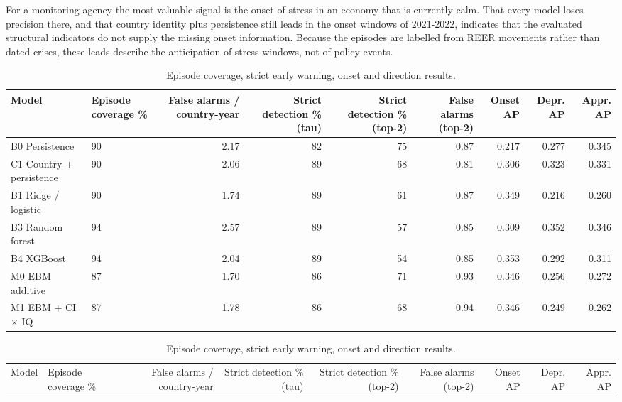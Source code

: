 \documentclass[preprint,12pt,authoryear]{elsarticle}
\begin{document}
For a monitoring agency the most valuable signal is the onset of stress in an economy that is currently calm. That every model loses precision there, and that country identity plus persistence still leads in the onset windows of 2021-2022, indicates that the evaluated structural indicators do not supply the missing onset information. Because the episodes are labelled from REER movements rather than dated crises, these leads describe the anticipation of stress windows, not of policy events.

\begin{table}[!htbp]
\centering
\scriptsize
\setlength{\tabcolsep}{3pt}
\caption{Episode coverage, strict early warning, onset and direction results.}
\label{tab:events}
\par{}\par\smallskip
\begin{adjustbox}{max width=\textwidth}
\begin{tabular}{llrrrrrrr}
\toprule
Model & Episode coverage \% & False alarms / country-year & Strict detection \% (tau) & Strict detection \% (top-2) & False alarms (top-2) & Onset AP & Depr. AP & Appr. AP \\
\midrule
B0 Persistence & 90 & 2.17 & 82 & 75 & 0.87 & 0.217 & 0.277 & 0.345 \\
C1 Country + persistence & 90 & 2.06 & 89 & 68 & 0.81 & 0.306 & 0.323 & 0.331 \\
B1 Ridge / logistic & 90 & 1.74 & 89 & 61 & 0.87 & 0.349 & 0.216 & 0.260 \\
B3 Random forest & 94 & 2.57 & 89 & 57 & 0.85 & 0.309 & 0.352 & 0.346 \\
B4 XGBoost & 94 & 2.04 & 89 & 54 & 0.85 & 0.353 & 0.292 & 0.311 \\
M0 EBM additive & 87 & 1.70 & 86 & 71 & 0.93 & 0.346 & 0.256 & 0.272 \\
M1 EBM + CI $\times$ IQ & 87 & 1.78 & 86 & 68 & 0.94 & 0.346 & 0.249 & 0.262 \\
\bottomrule
\end{tabular}
\end{adjustbox}
\par{}\par\smallskip
\begin{adjustbox}{max width=\textwidth}
\begin{tabular}{llrrrrrrr}
\toprule
Model & Episode coverage \% & False alarms / country-year & Strict detection \% (tau) & Strict detection \% (top-2) & False alarms (top-2) & Onset AP & Depr. AP & Appr. AP \\

\end{tabular}
\end{adjustbox}
\end{table}
\end{document}
